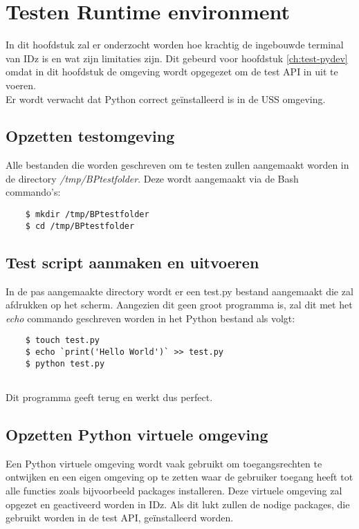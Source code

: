 \chapter{Testen Runtime environment}
\label{ch:test-runtime}
In dit hoofdstuk zal er onderzocht worden hoe krachtig de ingebouwde terminal van IDz is en wat zijn limitaties zijn. Dit gebeurd voor hoofdstuk \ref{ch:test-pydev} omdat in dit hoofdstuk de omgeving wordt opgegezet om de test API in uit te voeren. \\
Er wordt verwacht dat Python correct geïnstalleerd is in de USS omgeving.

\section{Opzetten testomgeving}
Alle bestanden die worden geschreven om te testen zullen aangemaakt worden in de directory \textit{/tmp/BPtestfolder}. 
Deze wordt aangemaakt via de Bash commando's: 

\begin{lstlisting}
    $ mkdir /tmp/BPtestfolder
    $ cd /tmp/BPtestfolder
\end{lstlisting}

\section{Test script aanmaken en uitvoeren}
In de pas aangemaakte directory wordt er een test.py bestand aangemaakt die  zal afdrukken op het scherm. Aangezien dit geen groot programma is, zal dit met het \textit{echo} commando geschreven worden in het Python bestand als volgt:

\begin{lstlisting}
    $ touch test.py
    $ echo `print('Hello World')` >> test.py
    $ python test.py
    
\end{lstlisting}

Dit programma geeft  terug en werkt dus perfect.

\section{Opzetten Python virtuele omgeving}
Een Python virtuele omgeving wordt vaak gebruikt om toegangsrechten te ontwijken en een eigen omgeving op te zetten waar de gebruiker toegang heeft tot alle functies zoals bijvoorbeeld packages installeren. Deze virtuele omgeving zal opgezet en geactiveerd worden in IDz. Als dit lukt zullen de nodige packages, die gebruikt worden in de test API, geïnstalleerd worden. \\

